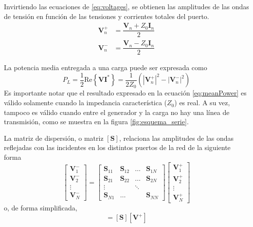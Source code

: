 Invirtiendo las ecuaciones de \ref{eq:voltages}, se obtienen las amplitudes de las ondas de tensión en función de las tensiones y corrientes totales del puerto.
\begin{equation}\label{eq:voltageWaves}
\begin{aligned}
  \bm{V}_n^+ &= \dfrac{\bm{V}_n + Z_0\bm{I}_n}{2}\\
  \bm{V}_n^- &= \dfrac{\bm{V}_n - Z_0\bm{I}_n}{2}
\end{aligned}
\end{equation}

La potencia media entregada a una carga puede ser expresada como
\begin{equation}\label{eq:meanPower}
  P_L = \dfrac{1}{2}\text{Re}\left\lbrace \bm{V}\bm{I}^*\right\rbrace = \dfrac{1}{2Z_0}(|\bm{V}_n^+|^2 - |\bm{V}_n^-|^2)
\end{equation}
Es importante notar que el resultado expresado en la ecuación \ref{eq:meanPower} es válido solamente cuando la impedancia característica ($Z_0$) es real. A su vez, tampoco es válido cuando entre el generador y la carga no hay una línea de transmisión, como se muestra en la figura \ref{fig:esquema_serie}.

La matriz de dispersión, o matriz $[\bm{S}]$, relaciona las amplitudes de las ondas reflejadas con las incidentes en los distintos puertos de la red de la siguiente forma
\begin{equation}
  \begin{bmatrix} \bm{V}_1^- \\ \bm{V}_2^- \\ \vdots \\ \bm{V}_N^- \end{bmatrix} = \begin{bmatrix} \bm{S}_{11} & \bm{S}_{12} & \dots & \bm{S}_{1N} \\ \bm{S}_{21} & \bm{S}_{22} & \dots & \bm{S}_{2N} \\ \vdots & & \ddots & \\ \bm{S}_{N1} & \dots & & \bm{S}_{NN} \end{bmatrix}\begin{bmatrix} \bm{V}_1^+ \\ \bm{V}_2^+ \\ \vdots \\ \bm{V}_N^+ \end{bmatrix}
\end{equation}
o, de forma simplificada,
\begin{equation}
  [\bm{V}^-] = [\bm{S}] [\bm{V}^+]
\end{equation}


